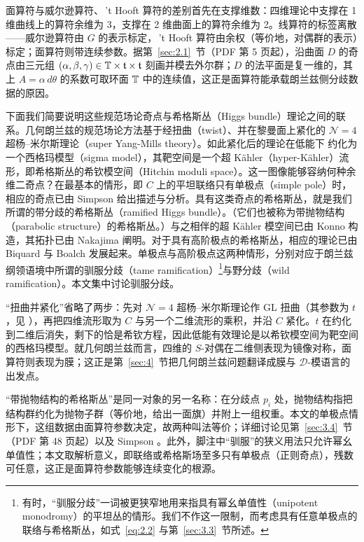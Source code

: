 \begin{yizhu}[物理图像补充]
面算符与威尔逊算符、\,'t Hooft 算符的差别首先在支撑维数：四维理论中支撑在 1 维曲线上的算符余维为 3，支撑在 2 维曲面上的算符余维为 2。线算符的标签离散——威尔逊算符由 $G$ 的表示标定，\,'t Hooft 算符由余权（等价地，对偶群的表示）标定；面算符则带连续参数。据第~\ref{sec:2.1}~节（PDF 第 5 页起），沿曲面 $D$ 的奇点由三元组 $(\alpha,\beta,\gamma)\in{\mathbb{T}}\times\mathfrak t\times\mathfrak t$ 刻画并模去外尔群；$D$ 的法平面是复一维的，其上 $A=\alpha\,d\theta$ 的系数可取环面 ${\mathbb{T}}$ 中的连续值，这正是面算符能承载朗兰兹侧分歧数据的原因。
\end{yizhu}

下面我们简要说明这些规范场论奇点与希格斯丛（Higgs bundle）理论之间的联系。几何朗兰兹的规范场论方法基于经扭曲（twist）、并在黎曼面上紧化的 ${\mathcal N}=4$ 超杨–米尔斯理论（super Yang-Mills theory）。如此紧化后的理论在低能下 \cite{ref19,ref20} 约化为一个西格玛模型（sigma model），其靶空间是一个超 Kähler（hyper-Kähler）流形，即希格斯丛的希钦模空间（Hitchin moduli space）\cite{ref21}。这一图像能够容纳何种余维二奇点？在最基本的情形，即 $C$ 上的平坦联络只有单极点（simple pole）时，相应的奇点已由 Simpson \cite{ref22} 给出描述与分析。具有这类奇点的希格斯丛，就是我们所谓的带分歧的希格斯丛（ramified Higgs bundle）。（它们也被称为带抛物结构（parabolic structure）的希格斯丛。）与之相伴的超 Kähler 模空间已由 Konno \cite{ref23} 构造，其拓扑已由 Nakajima \cite{ref24} 阐明。对于具有高阶极点的希格斯丛，相应的理论已由 Biquard 与 Boalch \cite{ref25} 发展起来。单极点与高阶极点这两种情形，分别对应于朗兰兹纲领语境中所谓的驯服分歧（tame ramification）\footnote{有时，“驯服分歧”一词被更狭窄地用来指具有幂幺单值性（unipotent monodromy）的平坦丛的情形。我们不作这一限制，而考虑具有任意单极点的联络与希格斯丛，如式~\eqref{eq:2.2} 与第~\ref{sec:3.3}~节所述。}与野分歧（wild ramification）。本文集中讨论驯服分歧。

\begin{yizhu}[物理图像补充]
“扭曲并紧化”省略了两步：先对 ${\mathcal N}=4$ 超杨–米尔斯理论作 GL 扭曲（其参数为 $t$，见 \cite{ref8}），再把四维流形取为 $C$ 与另一个二维流形的乘积，并沿 $C$ 紧化。$t$ 在约化到二维后消失，剩下的恰是希钦方程，因此低能有效理论是以希钦模空间为靶空间的西格玛模型。就几何朗兰兹而言，四维的 $S$-对偶在二维侧表现为镜像对称，面算符则表现为膜；这正是第~\ref{sec:4}~节把几何朗兰兹问题翻译成膜与 ${\mathcal D}$-模语言的出发点。
\end{yizhu}

\begin{yizhu}[含糊点拨]
“带抛物结构的希格斯丛”是同一对象的另一名称：在分歧点 $p_i$ 处，抛物结构指把结构群约化为抛物子群（等价地，给出一面旗）并附上一组权重。本文的单极点情形下，这组数据由面算符参数决定，故两种叫法等价；详细讨论见第~\ref{sec:3.4}~节（PDF 第 48 页起）以及 Simpson \cite{ref22}。此外，脚注中“驯服”的狭义用法只允许幂幺单值性；本文取解析意义，即联络或希格斯场至多只有单极点（正则奇点），残数可任意，这正是面算符参数能够连续变化的根源。
\end{yizhu}

